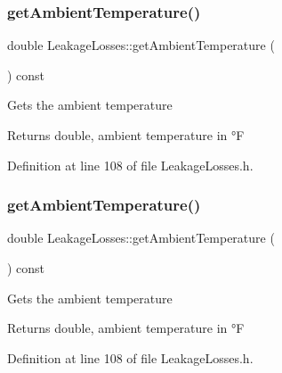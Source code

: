 \mbox{\label{class_leakage_losses_af67ad0af750484b13dd311c881f71c61}} 
\subsubsection{\texorpdfstring{get\+Ambient\+Temperature()}{getAmbientTemperature()}\hspace{0.1cm}{\footnotesize\ttfamily [2/3]}}
{\footnotesize\ttfamily double Leakage\+Losses\+::get\+Ambient\+Temperature (\begin{DoxyParamCaption}{ }\end{DoxyParamCaption}) const\hspace{0.3cm}{\ttfamily [inline]}}

Gets the ambient temperature \begin{DoxyReturn}{Returns}
double, ambient temperature in °F 
\end{DoxyReturn}


Definition at line 108 of file Leakage\+Losses.\+h.

\mbox{\label{class_leakage_losses_af67ad0af750484b13dd311c881f71c61}} 
\subsubsection{\texorpdfstring{get\+Ambient\+Temperature()}{getAmbientTemperature()}\hspace{0.1cm}{\footnotesize\ttfamily [3/3]}}
{\footnotesize\ttfamily double Leakage\+Losses\+::get\+Ambient\+Temperature (\begin{DoxyParamCaption}{ }\end{DoxyParamCaption}) const\hspace{0.3cm}{\ttfamily [inline]}}

Gets the ambient temperature \begin{DoxyReturn}{Returns}
double, ambient temperature in °F 
\end{DoxyReturn}


Definition at line 108 of file Leakage\+Losses.\+h.

